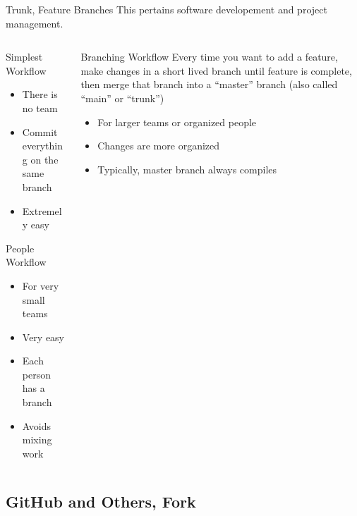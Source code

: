 \documentclass[xetex]{beamer}
\begin{document}
\begin{frame}{Trunk, Feature Branches}
  This pertains software developement and project management.
  \begin{columns}[t]
    \begin{column}{.5\linewidth}
      \begin{block}{Simplest Workflow}
        \begin{itemize}
          \item There is no team
          \item Commit everything on the same branch
          \item Extremely easy
        \end{itemize}
      \end{block}
      \pause
      \begin{block}{People Workflow}
        \begin{itemize}
          \item For very small teams
          \item Very easy
          \item Each person has a branch
          \item Avoids mixing work
        \end{itemize}
      \end{block}
    \end{column}
    \begin{column}{.5\linewidth}
      \pause
      \begin{alertblock}{Branching Workflow}
        Every time you want to add a feature, make changes in a short lived
        branch until feature is complete, then merge that branch into a
        ``master'' branch (also called ``main'' or ``trunk'')
        \begin{itemize}
          \item For larger teams or organized people
          \item Changes are more organized
          \item Typically, master branch always compiles
        \end{itemize}
      \end{alertblock}
    \end{column}
  \end{columns}
\end{frame}

\subsection{GitHub and Others, Fork}
\end{document}
